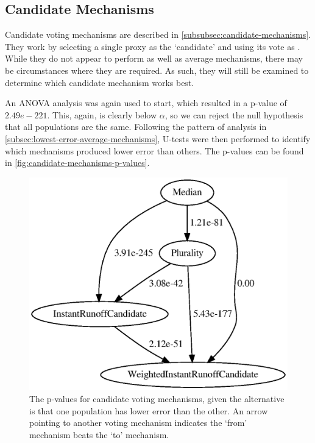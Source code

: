 \subsection{Candidate Mechanisms}\label{subsec:lowest-error-candidate-mechanisms}
Candidate voting mechanisms are described in \autoref{subsubsec:candidate-mechanisms}.
They work by selecting a single proxy as the `candidate' and using its vote as
\systemtruth.
While they do not appear to perform as well as average mechanisms, there may be
circumstances where they are required.
As such, they will still be examined to determine which candidate mechanism works best.

An ANOVA analysis was again used to start, which resulted in a p-value of
$2.49e-221$.
This, again, is clearly below $\alpha$, so we can reject the null hypothesis that all
populations are the same.
Following the pattern of analysis in
\autoref{subsec:lowest-error-average-mechanisms}, U-tests were then performed to
identify which mechanisms produced lower error than others.
The p-values can be found in \autoref{fig:candidate-mechanisms-p-values}.

\begin{figure}[htbp]
    \centering
    \includegraphics[scale=0.75]
    {./content/figures/voting_mechanisms/candidate-mechanisms-p-values.gv}
    \caption{The p-values for candidate voting mechanisms, given the alternative is
    that one population has lower error than the other.
    An arrow pointing to another voting mechanism indicates the `from' mechanism
    beats the `to' mechanism.}
    \label{fig:candidate-mechanisms-p-values}
\end{figure}

